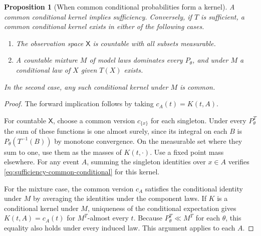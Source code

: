 \documentclass[11pt,oneside]{book}
\newtheorem{proposition}[theorem]{Proposition}
\theoremstyle{definition}
\theoremstyle{remark}
\begin{document}
\begin{proposition}[When common conditional probabilities form a kernel]
\label{prop:sufficiency-common-kernel-existence}
A common conditional kernel implies sufficiency. Conversely,
if $T$ is sufficient, a common conditional kernel exists in either
of the following cases.
\begin{enumerate}
\item The observation space $\mathsf X$ is countable with all
      subsets measurable.
\item A countable mixture $M$ of model laws dominates every
      $P_\theta$, and under $M$ a conditional law of $X$ given
      $T(X)$ exists.
\end{enumerate}
In the second case, any such conditional kernel under $M$ is common.
\end{proposition}
\begin{proof}
The forward implication follows by taking $c_A(t)=K(t,A)$.

For countable $\mathsf X$, choose a common version $c_{\{x\}}$
for each singleton. Under every $P_\theta^T$ the sum of these
functions is one almost surely, since its integral on each $B$
is $P_\theta(T^{-1}(B))$ by monotone convergence. On the measurable
set where they sum to one, use them as the masses of $K(t,\cdot)$.
Use a fixed point mass elsewhere. For any event $A$, summing the
singleton identities over $x\in A$ verifies
\eqref{eq:sufficiency-common-conditional} for this kernel.

For the mixture case, the common version $c_A$ satisfies the
conditional identity under $M$ by averaging the identities
under the component laws. If $K$ is a conditional kernel under
$M$, uniqueness of the conditional expectation gives
$K(t,A)=c_A(t)$ for $M^T$-almost every $t$. Because
$P_\theta^T\ll M^T$ for each $\theta$, this equality also holds
under every induced law. This argument applies to each $A$.
\end{proof}
\end{document}
